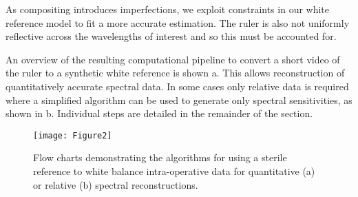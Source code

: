 As compositing introduces imperfections, we exploit constraints in our white reference model to fit a more accurate estimation.
%
The ruler is also not uniformly reflective across the wavelengths of interest and so this must be accounted for.
%

An overview of the resulting computational pipeline to convert a short video of the ruler to a synthetic white reference is shown a. This allows reconstruction of quantitatively accurate spectral data. In some cases only relative data is required where a simplified algorithm can be used to generate only spectral sensitivities, as shown in b. Individual steps are detailed in the remainder of the section.
% 
%
%   
%     
%     
%    
% 
\begin{figure}[h!]
	\centering
        \texttt{[image: Figure2]}
 \caption{Flow charts demonstrating the algorithms for using a sterile reference to white balance intra-operative data for quantitative (a) or relative (b) spectral reconstructions.}
 \label{fig:algorithm}
\end{figure}

